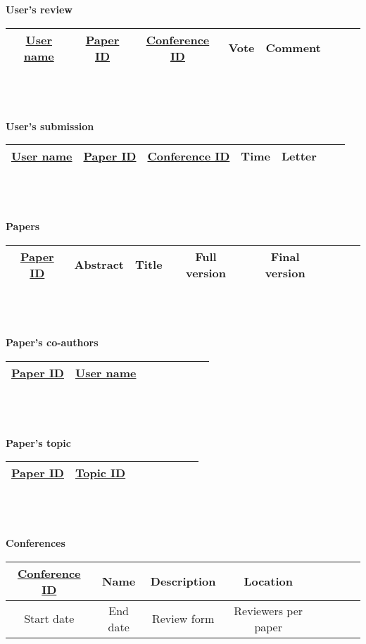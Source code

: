 \documentclass[12pt]{article}
\newcommand{\<}{\langle}
\renewcommand{\>}{\rangle}
\begin{document}
~\\
~\\
\textbf{User's review}\\
\begin{tabular}{|c|c|c|c|c|c|c|c|}
\hline 
\underline{User name}&
\underline{Paper ID}&
\underline{Conference ID}&
Vote & Comment\\
\hline 
\end{tabular}
~\\
~\\
~\\
\textbf{User's submission}\\
\begin{tabular}{|c|c|c|c|c|c|c|}
\hline 
\underline{User name}&
\underline{Paper ID}&
\underline{Conference ID}&
Time & Letter\\
\hline 
\end{tabular}
~\\
~\\
~\\
\textbf{Papers}\\
\begin{tabular}{|c|c|c|c|c|c|c|c|}
\hline 
\underline{Paper ID} & Abstract & Title & Full version & Final version\\ 
\hline 
\end{tabular}
~\\
~\\
~\\
\textbf{Paper's co-authors}\\
\begin{tabular}{|c|c|c|c|c|c|c|c|}
\hline 
\underline{Paper ID} & \underline{User name}\\ 
\hline 
\end{tabular}
~\\
~\\
~\\
\textbf{Paper's topic}\\
\begin{tabular}{|c|c|c|c|c|c|c|c|}
\hline 
\underline{Paper ID} & \underline{Topic ID}\\
\hline 
\end{tabular}
~\\
~\\
~\\
\textbf{Conferences}\\
\begin{tabular}{|c|c|c|c|c|c|c|c|}
\hline 
\underline{Conference ID} & Name & Description & Location\\ 
\hline 
Start date & End date & Review form & Reviewers per paper\\
\hline 
\end{tabular}
\end{document}
